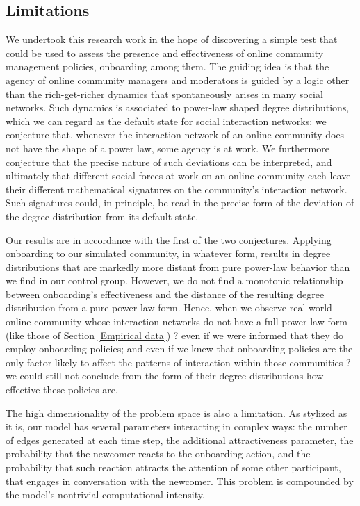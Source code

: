 \subsection{Limitations}

We undertook this research work in the hope of discovering a simple test that could be used to assess the presence and effectiveness of online community management policies, onboarding among them. The guiding idea is that the agency of online community managers and moderators is guided by a logic other than the rich-get-richer dynamics that spontaneously arises in many social networks. Such dynamics is associated to power-law shaped degree distributions, which we can regard as the default state for social interaction networks: we conjecture that, whenever the interaction network of an online community does not have the shape of a power law, some agency is at work. We furthermore conjecture that the precise nature of such deviations can be interpreted, and ultimately that different social forces at work on an online community each leave their different mathematical signatures on the community's interaction network. Such signatures could, in principle, be read in the precise form of the deviation of the degree distribution from its default state. 

Our results are in accordance with the first of the two conjectures. Applying onboarding to our simulated community, in whatever form, results in degree distributions that are markedly more distant from pure power-law behavior than we find in our control group. However, we do not find a monotonic relationship between onboarding's effectiveness and the distance of the resulting degree distribution from a pure power-law form. Hence, when we observe real-world online community whose interaction networks do not have a full power-law form (like those of Section \ref{Empirical data}) ? even if we were informed that they do employ onboarding policies; and even if we knew that onboarding policies are the only factor likely to affect the patterns of interaction within those communities ? we could still not conclude from the form of their degree distributions how effective these policies are. 

The high dimensionality of the problem space is also a limitation. As stylized as it is, our model has several parameters interacting in complex ways: the number of edges generated at each time step, the additional attractiveness parameter, the probability that the newcomer reacts to the onboarding action, and the probability that such reaction attracts the attention of some other participant, that engages in conversation with the newcomer. This problem is compounded by the model's nontrivial computational intensity. 


